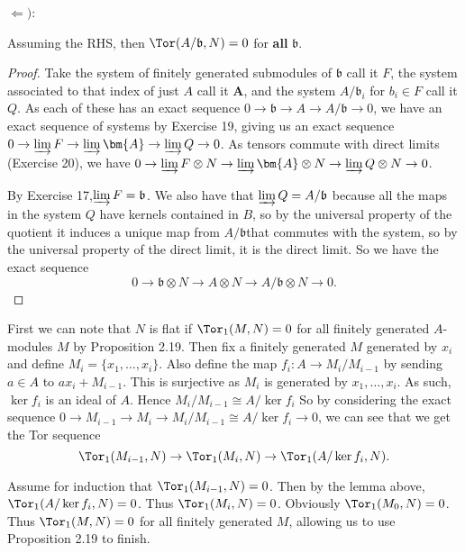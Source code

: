 \documentclass[a4paper]{exam}
\begin{document}
\begin{questions}
\begin{solution}
		$\Leftarrow)$:
		\begin{lem}
			Assuming the RHS, then $\Tor(A / \mathfrak{b},N) = 0$ for \textbf{all} $\mathfrak{b}$.
		\end{lem}
		\begin{proof}
			Take the system of finitely generated submodules of $\mathfrak{b}$ call it $F $, the system associated to that index of just $A$ call it $\bm{A} $, and the system $A / \mathfrak{b}_i$ for $b_i \in F$ call it $Q$.
			As each of these has an exact sequence $0\to\mathfrak{b} \to A \to A / \mathfrak{b}\to 0$, we have an exact sequence of systems by Exercise 19, giving us an exact sequence $0\to \varinjlim F \to \varinjlim \bm{A} \to \varinjlim Q \to 0$.
			As tensors commute with direct limits (Exercise 20), we have $0\to \varinjlim F \otimes N \to \varinjlim \bm{A} \otimes N \to \varinjlim Q \otimes N \to 0$.

			By Exercise 17,$\varinjlim F = \mathfrak{b}$.
			We also have that $\varinjlim Q = A / \mathfrak{b}$ because all the maps in the system $Q$ have kernels contained in $B $, so by the universal property of the quotient it induces a unique map from $A / \mathfrak{b} $that commutes with the system, so by the universal property of the direct limit, it is the direct limit.
			So we have the exact sequence
			\[
				0 \to \mathfrak{b} \otimes N \to A \otimes N \to A / \mathfrak{b} \otimes N\to 0
			.\]
		\end{proof}

		First we can note that $N$ is flat if $\Tor_1(M,N) = 0$ for all finitely generated $A$-modules $M$ by Proposition 2.19.
		Then fix a finitely generated $M$ generated by $x_i$ and define $M_i = \{x_{1},\ldots, x_i\}$.
		Also define the map $f_i: A \to M_i / M_{i-1}$ by sending $a \in A$ to $ax_i + M_{i-1}$.
		This is surjective as $M_i$ is generated by $x_{1}, \ldots , x_i$.
		As such,$\ker f_i$ is an ideal of $A$.
		Hence $M_i / M_{i-1} \cong A / \ker f_i $
		So by considering the exact sequence $0 \to M_{i-1} \to M_{i}\to M_i / M_{i-1} \cong A / \ker f_i \to 0$, we can see that we get the Tor sequence
		\[
			\Tor_1(M_{i-1},N) \to \Tor_1(M_i,N) \to \Tor_1(A / \ker f_i, N)
		.\]

		Assume for induction that $\Tor_1(M_{i-1},N) = 0$.
		Then by the lemma above,$\Tor_1(A / \ker f_i,N) = 0$.
		Thus $\Tor_{1}(M_i,N) = 0$.
		Obviously $\Tor_{1}(M_{0},N) = 0$.
		Thus $\Tor_{1}(M,N) = 0$ for all finitely generated $M $, allowing us to use Proposition 2.19 to finish.
	\end{solution}


\end{questions}
\end{document}
